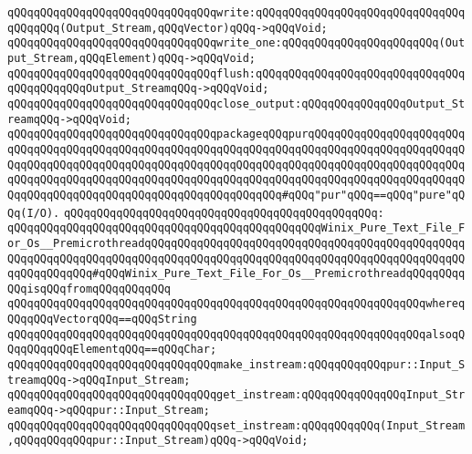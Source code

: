 \verb|qQQqqQQqqQQqqQQqqQQqqQQqqQQqqQQqwrite:qQQqqQQqqQQqqQQqqQQqqQQqqQQqqQQqqQQqqQQq(Output_Stream,qQQqVector)qQQq->qQQqVoid;|\newline
\verb|qQQqqQQqqQQqqQQqqQQqqQQqqQQqqQQqwrite_one:qQQqqQQqqQQqqQQqqQQqqQQq(Output_Stream,qQQqElement)qQQq->qQQqVoid;|\newline
\verb|qQQqqQQqqQQqqQQqqQQqqQQqqQQqqQQqflush:qQQqqQQqqQQqqQQqqQQqqQQqqQQqqQQqqQQqqQQqqQQqOutput_StreamqQQq->qQQqVoid;|\newline
\verb|qQQqqQQqqQQqqQQqqQQqqQQqqQQqqQQqclose_output:qQQqqQQqqQQqqQQqOutput_StreamqQQq->qQQqVoid;|\newline
\newline
\verb|qQQqqQQqqQQqqQQqqQQqqQQqqQQqqQQqpackageqQQqpurqQQqqQQqqQQqqQQqqQQqqQQqqQQqqQQqqQQqqQQqqQQqqQQqqQQqqQQqqQQqqQQqqQQqqQQqqQQqqQQqqQQqqQQqqQQqqQQqqQQqqQQqqQQqqQQqqQQqqQQqqQQqqQQqqQQqqQQqqQQqqQQqqQQqqQQqqQQqqQQqqQQqqQQqqQQqqQQqqQQqqQQqqQQqqQQqqQQqqQQqqQQqqQQqqQQqqQQqqQQqqQQqqQQqqQQqqQQqqQQqqQQqqQQqqQQqqQQqqQQqqQQqqQQqqQQqqQQq#qQQq"pur"qQQq==qQQq"pure"qQQq(I/O).|\newline
\verb|qQQqqQQqqQQqqQQqqQQqqQQqqQQqqQQqqQQqqQQqqQQqqQQq:|\newline
\verb|qQQqqQQqqQQqqQQqqQQqqQQqqQQqqQQqqQQqqQQqqQQqqQQqWinix_Pure_Text_File_For_Os__PremicrothreadqQQqqQQqqQQqqQQqqQQqqQQqqQQqqQQqqQQqqQQqqQQqqQQqqQQqqQQqqQQqqQQqqQQqqQQqqQQqqQQqqQQqqQQqqQQqqQQqqQQqqQQqqQQqqQQqqQQqqQQqqQQqqQQqqQQq#qQQqWinix_Pure_Text_File_For_Os__PremicrothreadqQQqqQQqqQQqisqQQqfromqQQqqQQqqQQq|\newline
\verb|qQQqqQQqqQQqqQQqqQQqqQQqqQQqqQQqqQQqqQQqqQQqqQQqqQQqqQQqqQQqqQQqwhereqQQqqQQqVectorqQQq==qQQqString|\newline
\verb|qQQqqQQqqQQqqQQqqQQqqQQqqQQqqQQqqQQqqQQqqQQqqQQqqQQqqQQqqQQqqQQqalsoqQQqqQQqqQQqElementqQQq==qQQqChar;|\newline
\newline
\verb|qQQqqQQqqQQqqQQqqQQqqQQqqQQqqQQqmake_instream:qQQqqQQqqQQqpur::Input_StreamqQQq->qQQqInput_Stream;|\newline
\verb|qQQqqQQqqQQqqQQqqQQqqQQqqQQqqQQqget_instream:qQQqqQQqqQQqqQQqInput_StreamqQQq->qQQqpur::Input_Stream;|\newline
\verb|qQQqqQQqqQQqqQQqqQQqqQQqqQQqqQQqset_instream:qQQqqQQqqQQq(Input_Stream,qQQqqQQqqQQqpur::Input_Stream)qQQq->qQQqVoid;|\newline
\newline
